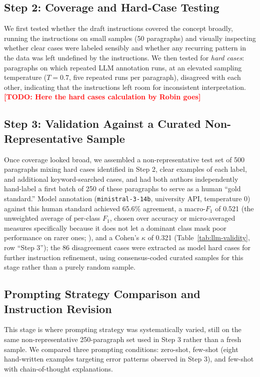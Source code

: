 \documentclass[a4paper,oneside,bibliography=totoc]{scrartcl}
\newcommand{\todo}[1]{\textcolor{red}{\textbf{[TODO: #1]}}}
\begin{document}
\subsection*{Step 2: Coverage and Hard-Case Testing}

We first tested whether the draft instructions covered the concept broadly, running the instructions on small samples (50 paragraphs) and visually inspecting whether clear cases were labeled sensibly and whether any recurring pattern in the data was left undefined by the instructions. We then tested for \emph{hard cases}: paragraphs on which repeated LLM annotation runs, at an elevated sampling temperature ($T=0.7$, five repeated runs per paragraph), disagreed with each other, indicating that the instructions left room for inconsistent interpretation. \todo{Here the hard cases calculation by Robin goes}

\subsection*{Step 3: Validation Against a Curated Non-Representative Sample}

Once coverage looked broad, we assembled a non-representative test set of 500 paragraphs mixing hard cases identified in Step 2, clear examples of each label, and additional keyword-searched cases, and had both authors independently hand-label a first batch of 250 of these paragraphs to serve as a human ``gold standard.'' Model annotation (\texttt{ministral-3-14b}, university API, temperature 0) against this human standard achieved 65.6\% agreement, a macro-$F_1$ of 0.521 (the unweighted average of per-class $F_1$, chosen over accuracy or micro-averaged measures specifically because it does not let a dominant class mask poor performance on rarer ones; \citealp{sokolova2009}), and a Cohen's $\kappa$ of 0.321 (Table~\ref{tab:llm-validity}, row ``Step 3''); the 86 disagreement cases were extracted as model hard cases for further instruction refinement, using consensus-coded curated samples for this stage rather than a purely random sample.

\subsection{Prompting Strategy Comparison and Instruction Revision}

This stage is where prompting strategy was systematically varied, still on the same non-representative 250-paragraph set used in Step 3 rather than a fresh sample. We compared three prompting conditions: zero-shot, few-shot (eight hand-written examples targeting error patterns observed in Step 3), and few-shot with chain-of-thought explanations.
\end{document}
